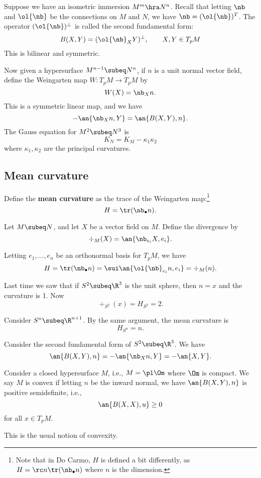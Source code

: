 
Suppose we have an isometric immersion $M^m\hra N^n$. Recall that letting $\nb$ and $\ol{\nb}$ be the connections on $M$ and $N$, we have $\nb=(\ol{\nb})^T$. The operator $(\ol{\nb})^{\perp}$ is called the second fundamental form:
\[
B(X,Y)=(\ol{\nb}_XY)^{\perp},\qquad X,Y\in T_pM
\]
This is bilinear and symmetric.

Now given a hypersurface $M^{n-1}\subeq N^n$, if $n$ is a unit normal vector field, define the Weingarten map $W:T_pM\to T_pM$ by
\[
W(X)=\nb_X n.
\]
This is a symmetric linear map, and we have
\[
-\an{\nb_X n,Y}=\an{B(X,Y),n}.
\]
The Gauss equation for $M^2\subeq N^3$ is
\[
K_N=K_M-\kappa_1\kappa_2
\]
where $\kappa_1,\kappa_2$ are the principal curvatures. 

\subsection{Mean curvature}
\begin{df}
Define the \textbf{mean curvature} as the trace of the Weingarten map:\footnote{Note that in Do Carmo, $H$ is defined a bit differently, as $H=\rc n\tr(\nb_{\bullet}n)$ where $n$ is the dimension.}
\[
H=\tr(\nb_{\bullet} n).
\]
\end{df}
\begin{df}
Let $M\subeq N$, and let $X$ be a vector field on $M$. Define the divergence by
\[\div_M(X)=\an{\nb_{e_i}X,e_i}.\]
\end{df}
Letting $e_1,\ldots, e_n$ be an orthonormal basis for $T_pM$, we have
\[
H=\tr(\nb_{\bullet} n)=\sui \an{\ol{\nb}_{e_i}n,e_i}=\div_M(n).
\]
\begin{ex}
Last time we saw that if $S^2\subeq \R^3$ is the unit sphere, then $n=x$ and the curvature is 1. Now
\[
\div_{S^2}(x)=H_{S^2}=2.
\]
\end{ex}
\begin{ex}
Consider $S^{n}\subeq \R^{n+1}$. By the same argument, the mean curvature is 
\[
H_{S^n}=n.
\]
\end{ex}
Consider the second fundamental form of $S^2\subeq \R^3$. We have
\[
\an{B(X,Y),n}=-\an{\nb_X n,Y}=-\an{X,Y}.
\]
\begin{df}
Consider a closed hypersurface $M$, i.e., $M=\pl \Om$ where $\Om$ is compact. We say $M$ is convex if letting $n$ be the inward normal, we have $\an{B(X,Y),n}$ is positive semidefinite, i.e.,
\[
\an{B(X,X),u}\ge 0
\]
for all $x\in T_pM$.
\end{df}
This is the usual notion of convexity.

